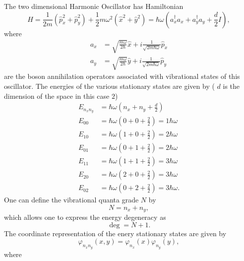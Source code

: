 \documentclass[aps,preprint]{revtex4}%
\begin{document}
The two dimensional Harmonic Oscillator has Hamiltonian
\begin{equation}
H=\frac{1}{2m}\left(  \widehat{p}_{x}^{2}+\widehat{p}_{y}^{2}\right)
+\frac{1}{2}m\omega^{2}\left(  \widehat{x}^{2}+\widehat{y}^{2}\right)
=\hbar\omega\left(  a_{x}^{\dagger}a_{x}+a_{y}^{\dagger}a_{y}+\frac{d}%
{2}I\right)  ,
\end{equation}
where%
\begin{align}
a_{x} &  =\sqrt{\frac{m\omega}{2\hbar}}\widehat{x}+i\frac{1}{\sqrt
{2m\hbar\omega}}\widehat{p}_{x}\\
a_{y} &  =\sqrt{\frac{m\omega}{2\hbar}}\widehat{y}+i\frac{1}{\sqrt
{2m\hbar\omega}}\widehat{p}_{y}%
\end{align}
are the boson annihilation operators associated with vibrational states of
this oscillator. The energies of the various stationary states are given by (
$d$ is the dimension of the space in this case $2$)%
\begin{align}
E_{n_{x}n_{y}} &  =\hbar\omega\left(  n_{x}+n_{y}+\frac{d}{2}\right)  \\
E_{00} &  =\hbar\omega\left(  0+0+\frac{2}{2}\right)  =1\hbar\omega\\
E_{10} &  =\hbar\omega\left(  1+0+\frac{2}{2}\right)  =2\hbar\omega\\
E_{01} &  =\hbar\omega\left(  0+1+\frac{2}{2}\right)  =2\hbar\omega\\
E_{11} &  =\hbar\omega\left(  1+1+\frac{2}{2}\right)  =3\hbar\omega\\
E_{20} &  =\hbar\omega\left(  2+0+\frac{2}{2}\right)  =3\hbar\omega\\
E_{02} &  =\hbar\omega\left(  0+2+\frac{2}{2}\right)  =3\hbar\omega.
\end{align}
One can define the vibrational quanta grade $N$ by
\begin{equation}
N=n_{x}+n_{y},
\end{equation}
which allows one to express the energy degeneracy as
\begin{equation}
\deg=N+1.
\end{equation}
The coordinate representation of the enery stationary states are given by
\begin{equation}
\varphi_{n_{x}n_{y}}\left(  x,y\right)  =\varphi_{n_{x}}\left(  x\right)
\varphi_{n_{y}}\left(  y\right)  ,
\end{equation}
where
\end{document}
